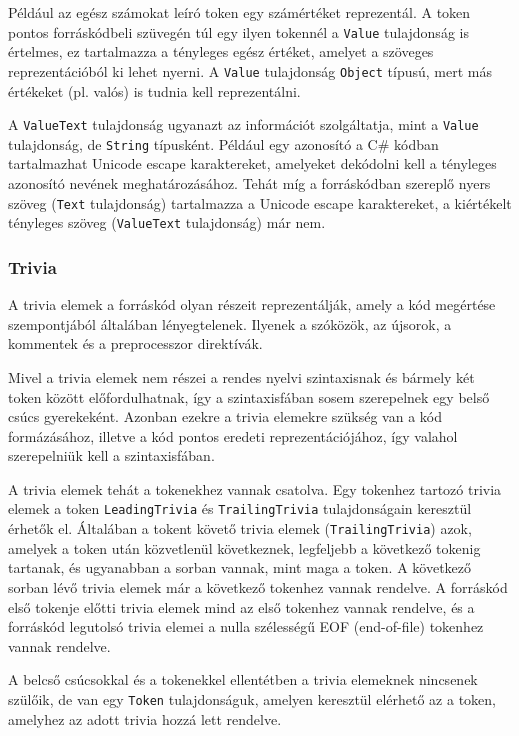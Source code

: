 \documentclass[12pt, a4paper]{report}
\newcommand{\f}[1]{\texttt{#1}}
\begin{document}
Például az egész számokat leíró token egy számértéket reprezentál. A token pontos forráskódbeli szüvegén túl egy ilyen tokennél a \f{Value} tulajdonság is értelmes, ez tartalmazza a tényleges egész értéket, amelyet a szöveges reprezentációból ki lehet nyerni. A \f{Value} tulajdonság \f{Object} típusú, mert más értékeket (pl. valós) is tudnia kell reprezentálni.

A \f{ValueText} tulajdonság ugyanazt az információt szolgáltatja, mint a \f{Value} tulajdonság, de \f{String} típusként. Például egy azonosító a C\# kódban tartalmazhat Unicode escape karaktereket, amelyeket dekódolni kell a tényleges azonosító nevének meghatározásához. Tehát míg a forráskódban szereplő nyers szöveg (\f{Text} tulajdonság) tartalmazza a Unicode escape karaktereket, a kiértékelt tényleges szöveg (\f{ValueText} tulajdonság) már nem.

\subsubsection{Trivia}

A trivia elemek a forráskód olyan részeit reprezentálják, amely a kód megértése szempontjából általában lényegtelenek. Ilyenek a szóközök, az újsorok, a kommentek és a preprocesszor direktívák.

Mivel a trivia elemek nem részei a rendes nyelvi szintaxisnak és bármely két token között előfordulhatnak, így a szintaxisfában sosem szerepelnek egy belső csúcs gyerekeként. Azonban ezekre a trivia elemekre szükség van a kód formázásához, illetve a kód pontos eredeti reprezentációjához, így valahol szerepelniük kell a szintaxisfában.

A trivia elemek tehát a tokenekhez vannak csatolva. Egy tokenhez tartozó trivia elemek a token \f{LeadingTrivia} és \f{TrailingTrivia} tulajdonságain keresztül érhetők el. Általában a tokent követő trivia elemek (\f{TrailingTrivia}) azok, amelyek a token után közvetlenül következnek, legfeljebb a következő tokenig tartanak, és ugyanabban a sorban vannak, mint maga a token. A következő sorban lévő trivia elemek már a következő tokenhez vannak rendelve. A forráskód első tokenje előtti trivia elemek mind az első tokenhez vannak rendelve, és a forráskód legutolsó trivia elemei a nulla szélességű EOF (end-of-file) tokenhez vannak rendelve.

A belcső csúcsokkal és a tokenekkel ellentétben a trivia elemeknek nincsenek szülőik, de van egy \f{Token} tulajdonságuk, amelyen keresztül elérhető az a token, amelyhez az adott trivia hozzá lett rendelve.
\end{document}

